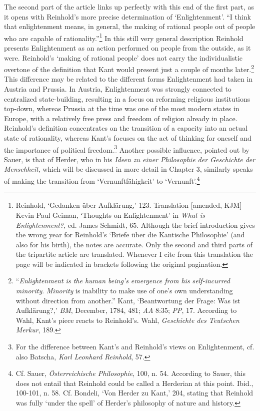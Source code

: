 The second part of the article links up perfectly with this end of the first part, as it opens with Reinhold's more precise determination of `Enlightenment'. ``I think that enlightenment means, in general, the making of rational people out of people who are capable of rationality.''\footnote{ Reinhold, `Gedanken \"{u}ber Aufkl\"{a}rung,' 123. Translation [amended, KJM] Kevin Paul Geiman, `Thoughts on Enlightenment' in \textit{What is Enlightenment?}, ed. James Schmidt, 65. Although the brief introduction gives the wrong year for Reinhold's `Briefe \"{u}ber die Kantische Philosophie' (and also for his birth), the notes are accurate. Only the second and third parts of the tripartite article are translated. Whenever I cite from this translation the page will be indicated in brackets following the original pagination.} In this still very general description Reinhold presents Enlightenment as an action performed on people from the outside, as it were. Reinhold's `making of rational people' does not carry the individualistic overtone of the definition that Kant would present just a couple of months later.\footnote{\label{footnote:_Ref218782785} ``\textit{Enlightenment is the human being's emergence from his self{-}incurred minority}.\textit{ Minority} is inability to make use of one's own understanding without direction from another.'' Kant, `Beantwortung der Frage: Was ist Aufkl\"{a}rung?,' \textit{BM}, December, 1784, 481; \textit{AA} 8:35; \textit{PP}, 17. According to Wahl, Kant's piece reacts to Reinhold's. Wahl, \textit{Geschichte des Teutschen Merkur}, 189.} This difference may be related to the different forms Enlightenment had taken in Austria and Prussia. In Austria, Enlightenment was strongly connected to centralized state{-}building, resulting in a focus on reforming religious institutions top{-}down, whereas Prussia at the time was one of the most modern states in Europe, with a relatively free press and freedom of religion already in place. Reinhold's definition concentrates on the transition of a capacity into an actual state of rationality, whereas Kant's focuses on the act of thinking for oneself and the importance of political freedom.\footnote{ For the difference between Kant's and Reinhold's views on Enlightenment, cf. also Batscha, \textit{Karl Leonhard Reinhold}, 57.} Another possible influence, pointed out by Sauer, is that of Herder, who in his \textit{Ideen zu einer Philosophie der Geschichte der Menschheit}, which will be discussed in more detail in Chapter 3, similarly speaks of making the transition from `Vernunftf\"{a}higkeit' to `Vernunft'.\footnote{ Cf. Sauer, \textit{\"{O}sterreichische Philosophie}, 100, n. 54. According to Sauer, this does not entail that Reinhold could be called a Herderian at this point. Ibid., 100{-}101, n. 58. Cf. Bondeli, `Von Herder zu Kant,' 204, stating that Reinhold was fully `under the spell' of Herder's philosophy of nature and history.}

